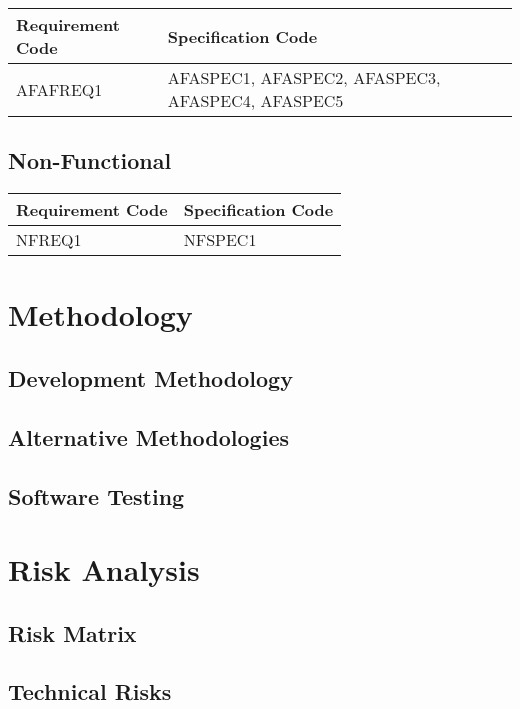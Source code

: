 \documentclass[11pt,a4paper]{article}
\begin{document}
\begin{longtable}{|p{2.7cm}|p{10cm}|}
\hline
\textbf{Requirement Code} & \textbf{Specification Code} \\

\hline \hline AFAFREQ1 & AFASPEC1, AFASPEC2, AFASPEC3, AFASPEC4, AFASPEC5  \\
\hline 
\end{longtable}


\subsection{Non-Functional}

\begin{longtable}{|p{2.7cm}|p{10cm}|}
\hline
\textbf{Requirement Code} & \textbf{Specification Code} \\

\hline \hline NFREQ1 & NFSPEC1\\
\hline 
\end{longtable}


\section{Methodology}
\label{sec:methodologies}

\subsection{Development Methodology}
\subsection{Alternative Methodologies}
\subsection{Software Testing}


\section{Risk Analysis}
\label{sec:risk-analysis}

\subsection{Risk Matrix}

\subsection{Technical Risks}
\label{sec:tech-risks}
\end{document}
